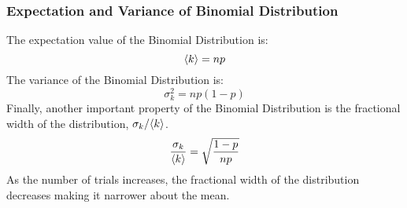 \documentclass[12pt, oneside]{book}
\DeclarePairedDelimiter{\evdel}{\langle}{\rangle}
\newcommand{\ev}{\evdel}
\begin{document}
\subsubsection{Expectation and Variance of Binomial Distribution}
The expectation value of the Binomial Distribution is:
\[ \ev{k} = np \]
The variance of the Binomial Distribution is:
\[ \sigma_k^2 = np\left(1-p\right) \]
Finally, another important property of the Binomial Distribution is the fractional width of the distribution, \(\sigma_k/\ev{k}\).
\[ \frac{\sigma_k}{\ev{k}} = \sqrt{ \frac{1-p}{np} } \]
As the number of trials increases, the fractional width of the distribution decreases making it narrower about the mean.
\end{document}
